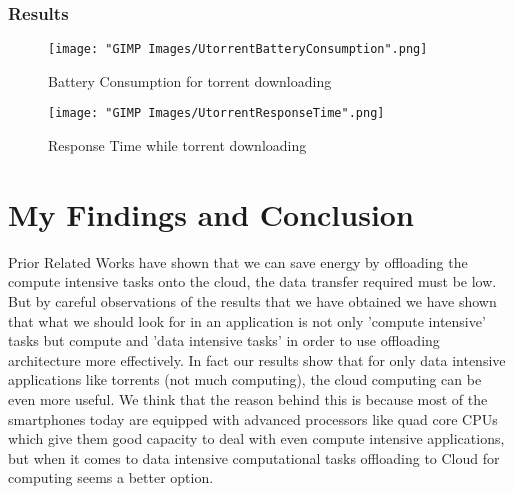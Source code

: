 \documentclass{report}
\begin{document}
\subsection{Results}

\begin{figure}[h]
  \centering
  \texttt{[image: "GIMP Images/UtorrentBatteryConsumption".png]}
  \caption{Battery Consumption for torrent downloading}
  \label{fig:UtorrentBatteryConsumption}
\end{figure}

\begin{figure}[h]
  \centering
  \texttt{[image: "GIMP Images/UtorrentResponseTime".png]}
  \caption{Response Time while torrent downloading}
  \label{fig:UtorrentResponseTime}
\end{figure}

\chapter{My Findings and Conclusion}
Prior Related Works have shown that we can save energy by offloading the compute intensive tasks onto the cloud, the data transfer required must be low. But by careful observations of the results that we have obtained we have shown that what we should look for in an application is not only 'compute intensive' tasks but compute and 'data intensive tasks' in order to use offloading architecture more effectively. In fact our results show that for only data intensive applications like torrents (not much computing), the cloud computing can be even more useful. We think that the reason behind this is because most of the smartphones today are equipped with advanced processors like quad core CPUs which give them good capacity to deal with even compute intensive applications, but when it comes to data intensive computational tasks offloading to Cloud for computing seems a better option. 









\end{document}

